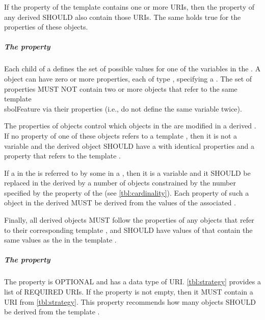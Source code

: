 If the  property of the template  contains one or more URIs, then the  property of any derived  SHOULD also contain those URIs. 
The same holds true for the  properties of these  objects.

\subparagraph{The  property}
\label{sec:hasVariableFeature}

Each  child of a  defines the set of possible values for one of the variables in the .
A  object can have zero or more  properties, each of type , specifying a . 
The set of  properties MUST NOT contain two or more  objects that refer to the same template \\sbol{Feature} via their  properties (i.e., do not define the same variable twice).

The  properties of  objects control which  objects in the  are modified in a derived .
If no  property of one of these  objects refers to a template , then it is not a variable and the derived object SHOULD have a  with identical properties
and a  property that refers to the template .

If a  in the  is referred to by some  in a , then it is a variable and it SHOULD be replaced in the derived  by a number of  objects constrained by the number specified by the  property of the  (see \ref{tbl:cardinality}).
Each property of such a  object in the derived  MUST be derived from the values of the  associated .


Finally, all derived  objects MUST follow the  properties of any 
 objects that refer to their corresponding template , and SHOULD have values of  that contain the same values as the  in the template .


\subparagraph{The  property}\label{sec:strategy}
The  property is OPTIONAL and has a data type of URI. \ref{tbl:strategy} provides a list of REQUIRED  URIs. If the  property is not empty, then it MUST contain a URI from \ref{tbl:strategy}. This property recommends how many  objects SHOULD be derived from the template .

